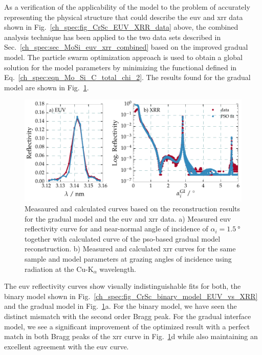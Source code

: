 As a verification of the applicability of the model to the problem of accurately representing the physical structure that could describe the \gls{euv} and \gls{xrr} data shown in Fig.~\ref{ch_spec:fig_CrSc_EUV_XRR_data} above, the combined analysis technique has been applied to the two data sets described in Sec.~\ref{ch_spec:sec_MoSi_euv_xrr_combined} based on the improved gradual model. The particle swarm optimization approach is used to obtain a global solution for the model parameters by minimizing the functional defined in Eq.~\eqref{ch_spec:eqn_Mo_Si_C_total_chi_2}. The results found for the gradual model are shown in Fig.~\ref{ch_spec:fig_CrSc_bianry_vs_gradual_model_fits}.
\begin{figure}[htbp]
  \centering
  \includegraphics[width=\textwidth]{img/CrSc_bianry_vs_gradual_model_fits}
  \caption{Measaured and calculated curves based on the reconstruction results for the gradual model and the \gls{euv} and \gls{xrr} data. a) Measured \gls{euv} reflectivity curve for and near-normal angle of incidence of $\alpha_i=\SI{1.5}{\degree}$ together with calculated curve of the \gls{pso}-based gradual model reconstruction. b) Measured and calculated \gls{xrr} curves for the same sample and model parameters at grazing angles of incidence using radiation at the Cu-K$_\alpha$ wavelength.}
  \label{ch_spec:fig_CrSc_bianry_vs_gradual_model_fits}
\end{figure}
The \gls{euv} reflectivity curves show visually indistinguishable fits for both, the binary model shown in Fig.~\ref{ch_spec:fig_CrSc_binary_model_EUV_vs_XRR} and the gradual model in Fig.~\ref{ch_spec:fig_CrSc_bianry_vs_gradual_model_fits}a. For the binary model, we have seen the distinct mismatch with the second order Bragg peak. For the gradual interface model, we see a significant improvement of the optimized result with a perfect match in both Bragg peaks of the \gls{xrr} curve in Fig.~\ref{ch_spec:fig_CrSc_bianry_vs_gradual_model_fits}d while also maintaining an excellent agreement with the \gls{euv} curve.

